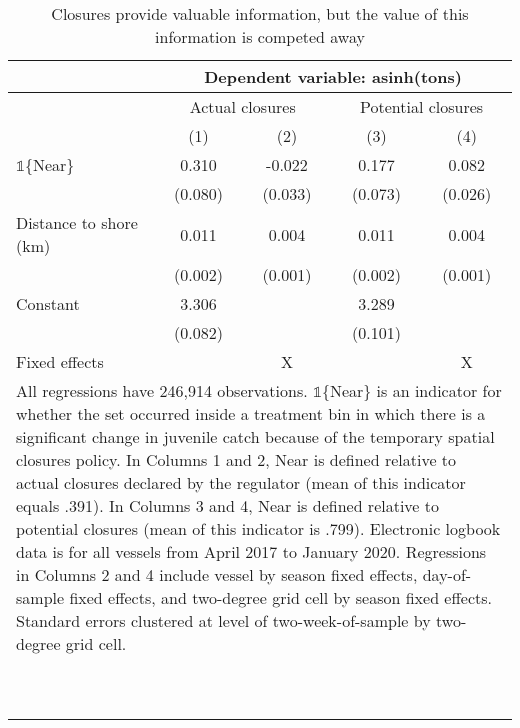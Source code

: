 \begin{table}[tb]
\centering
\caption{Closures provide valuable information, but the value of this information is competed away} 
\label{information_valuable}
\begin{tabular}{lcccc}
   \toprule & \multicolumn{4}{c}{Dependent variable: asinh(tons)} \\  \midrule & \multicolumn{2}{c}{Actual closures} & \multicolumn{2}{c}{Potential closures} \\ & (1) & (2) & (3) & (4) \\ 
   \midrule $\mathbb{1}$\{Near\} & 0.310 & -0.022 & 0.177 & 0.082 \\ 
   & (0.080) & (0.033) & (0.073) & (0.026) \\ 
  Distance to shore (km) & 0.011 & 0.004 & 0.011 & 0.004 \\ 
   & (0.002) & (0.001) & (0.002) & (0.001) \\ 
  Constant & 3.306 &  & 3.289 &  \\ 
   & (0.082) &  & (0.101) &  \\ 
   \midrule Fixed effects & & X & & X\\  \bottomrule \multicolumn{5}{l}{\multirow{2}{12cm}{All regressions have 246,914 observations. $\mathbb{1}$\{Near\} is an indicator for whether the set occurred inside a treatment bin in which there is a significant change in juvenile catch because of the temporary spatial closures policy. In Columns 1 and 2, Near is defined relative to actual closures declared by the regulator (mean of this indicator equals .391). In Columns 3 and 4, Near is defined relative to potential closures (mean of this indicator is .799). Electronic logbook data is for all vessels from April 2017 to January 2020. Regressions in Columns 2 and 4 include vessel by season fixed effects, day-of-sample fixed effects, and two-degree grid cell by season fixed effects. Standard errors clustered at level of two-week-of-sample by two-degree grid cell.}} \\\\\\\\\\\\\\\\\\\\\\\\ \end{tabular}
\end{table}
